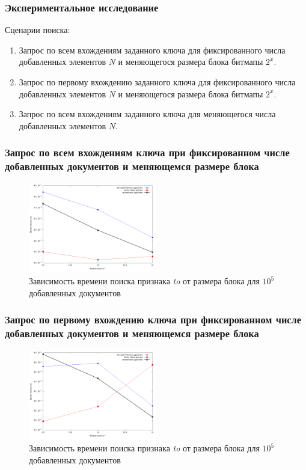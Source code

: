 \documentclass[aspectratio=169, pdf, 8pt, unicode]{beamer}
\begin{document}
\begin{frame}[fragile]
    \frametitle{Экспериментальное исследование}
{\large Сценарии поиска:}
    \vspace{4mm}
\begin{enumerate}
    \item Запрос по всем вхождениям заданного ключа для фиксированного числа
    добавленных элементов $N$ и меняющегося размера блока битмапы $2^{x}$.
    \vspace{4mm}
    \item Запрос по первому вхождению заданного ключа для фиксированного числа
    добавленных элементов $N$ и меняющегося размера блока битмапы $2^{x}$.
    \vspace{4mm}
    \item Запрос по всем вхождениям заданного ключа для меняющегося числа добавленных
    элементов $N$.
\end{enumerate}
\end{frame}

\begin{frame}[fragile]
\frametitle{Запрос по всем вхождениям ключа при фиксированном числе добавленных
документов и меняющемся размере блока}
\begin{figure}[H]
\centering
\includegraphics[width=0.5\textwidth]{fig/limit_1e6/1e5/to.png}
\caption{Зависимость времени поиска признака \textit{to} от размера блока для $10^5$ добавленных документов}
\end{figure}
\end{frame}

\begin{frame}[fragile]
\frametitle{Запрос по первому вхождению ключа при фиксированном числе
добавленных документов и меняющемся размере блока}
\begin{figure}[H]
\centering
\includegraphics[width=0.5\textwidth]{fig/limit_1/1e5/to.png}
\caption{Зависимость времени поиска признака \textit{to} от размера блока для $10^5$ добавленных документов}
\end{figure}
\end{frame}
\end{document}
